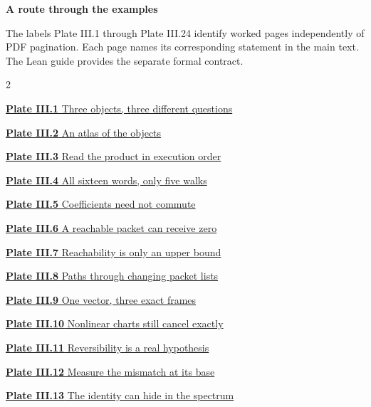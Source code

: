 \documentclass[11pt,letterpaper]{article}
\begin{document}
\KomorebiCover
{}
{\sffamily\bfseries\Large\color{accent}A route through the examples}\par\medskip
The labels Plate III.1 through Plate III.24 identify worked pages independently of PDF
pagination. Each page names its corresponding statement in the main text. The Lean guide provides the separate formal contract.
\medskip
\begin{multicols}{2}
{\small\noindent\hyperlink{vpage1}{\textbf{Plate III.1} Three objects, three different questions}\par\smallskip}
{\small\noindent\hyperlink{vpage2}{\textbf{Plate III.2} An atlas of the objects}\par\smallskip}
{\small\noindent\hyperlink{vpage3}{\textbf{Plate III.3} Read the product in execution order}\par\smallskip}
{\small\noindent\hyperlink{vpage4}{\textbf{Plate III.4} All sixteen words, only five walks}\par\smallskip}
{\small\noindent\hyperlink{vpage5}{\textbf{Plate III.5} Coefficients need not commute}\par\smallskip}
{\small\noindent\hyperlink{vpage6}{\textbf{Plate III.6} A reachable packet can receive zero}\par\smallskip}
{\small\noindent\hyperlink{vpage7}{\textbf{Plate III.7} Reachability is only an upper bound}\par\smallskip}
{\small\noindent\hyperlink{vpage8}{\textbf{Plate III.8} Paths through changing packet lists}\par\smallskip}
{\small\noindent\hyperlink{vpage9}{\textbf{Plate III.9} One vector, three exact frames}\par\smallskip}
{\small\noindent\hyperlink{vpage10}{\textbf{Plate III.10} Nonlinear charts still cancel exactly}\par\smallskip}
{\small\noindent\hyperlink{vpage11}{\textbf{Plate III.11} Reversibility is a real hypothesis}\par\smallskip}
{\small\noindent\hyperlink{vpage12}{\textbf{Plate III.12} Measure the mismatch at its base}\par\smallskip}
{\small\noindent\hyperlink{vpage13}{\textbf{Plate III.13} The identity can hide in the spectrum}\par\smallskip}

\end{multicols}
\end{document}
